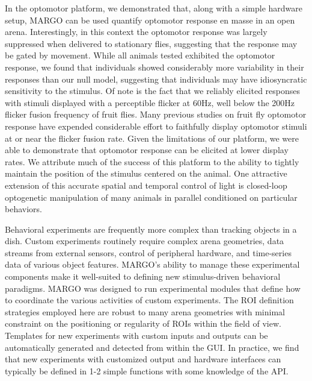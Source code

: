 \documentclass[10pt]{article}
\begin{document}
\begin{multicols}{2}
In the optomotor platform, we demonstrated that, along with a simple hardware setup, MARGO can be used quantify optomotor response en masse in an open arena. Interestingly, in this context the optomotor response was largely suppressed when delivered to stationary flies, suggesting that the response may be gated by movement. While all animals tested exhibited the optomotor response, we found that individuals showed considerably more variability in their responses than our null model, suggesting that individuals may have idiosyncratic sensitivity to the stimulus. Of note is the fact that we reliably elicited responses with stimuli displayed with a perceptible flicker at 60Hz, well below the 200Hz flicker fusion frequency of fruit flies. Many previous studies on fruit fly optomotor response have expended considerable effort to faithfully display optomotor stimuli at or near the flicker fusion rate. Given the limitations of our platform, we were able to demonstrate that optomotor response can be elicited at lower display rates. We attribute much of the success of this platform to the ability to tightly maintain the position of the stimulus centered on the animal. One attractive extension of this accurate spatial and temporal control of light is closed-loop optogenetic manipulation of many animals in parallel conditioned on particular behaviors.

Behavioral experiments are frequently more complex than tracking objects in a dish. Custom experiments routinely require complex arena geometries, data streams from external sensors, control of peripheral hardware, and time-series data of various object features. MARGO's ability to manage these experimental components make it well-suited to defining new stimulus-driven behavioral paradigms. MARGO was designed to run experimental modules that define how to coordinate the various activities of custom experiments. The ROI definition strategies employed here are robust to many arena geometries with minimal constraint on the positioning or regularity of ROIs within the field of view. Templates for new experiments with custom inputs and outputs can be automatically generated and detected from within the GUI. In practice, we find that new experiments with customized output and hardware interfaces can typically be defined in 1-2 simple functions with some knowledge of the API.


\end{multicols}
\end{document}
